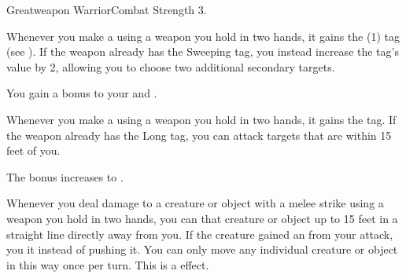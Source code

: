   \begin{feat}{Greatweapon Warrior}{Combat}
    \featpre Strength 3.

     Whenever you make a   using a weapon you hold in two hands, it gains the  (1) tag (see ).
    If the weapon already has the Sweeping tag, you instead increase the tag's value by 2, allowing you to choose two additional secondary targets.

     You gain a  bonus to your  and .

     Whenever you make a   using a weapon you hold in two hands, it gains the  tag.
    If the weapon already has the Long tag, you can attack targets that are within 15 feet of you.

     The bonus increases to .

     Whenever you deal damage to a creature or object with a melee strike using a weapon you hold in two hands, you can  that creature or object up to 15 feet in a straight line directly away from you.
    If the creature gained an  from your attack, you  it instead of pushing it.
    You can only move any individual creature or object in this way once per turn.
    This is a \atSizeBased effect.
  \end{feat}

